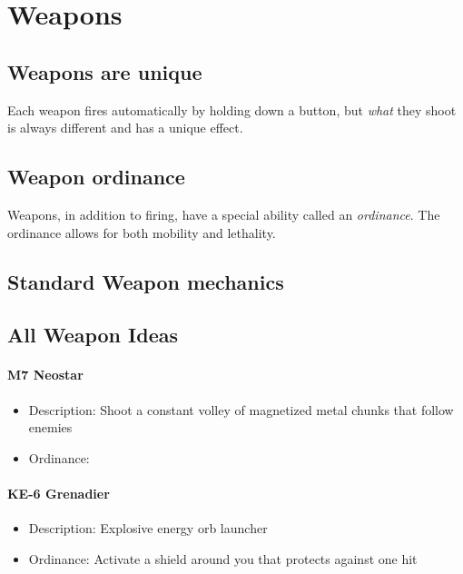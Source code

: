 \documentclass[../Main.tex]{subfiles}
\begin{document}
\section{Weapons}


\subsection{Weapons are unique}

Each weapon fires automatically by holding down a button, but \emph{what} they shoot is always different and has a unique effect. 

\subsection{Weapon ordinance}

Weapons, in addition to firing, have a special ability called an \emph{ordinance}. The ordinance allows for both mobility and lethality.

\subsection{Standard Weapon mechanics}


\subsection{All Weapon Ideas}

\paragraph{M7 Neostar}

\begin{itemize}
	\item Description: Shoot a constant volley of magnetized metal chunks that follow enemies
	\item Ordinance:
\end{itemize} 


\paragraph{KE-6 Grenadier}
 
\begin{itemize}
	\item Description: Explosive energy orb launcher
	\item Ordinance: Activate a shield around you that protects against one hit
\end{itemize} 
\end{document}
